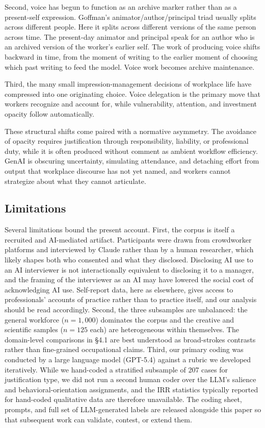 \documentclass[pdflatex,sn-basic]{sn-jnl}%
\theoremstyle{thmstyleone}%
\theoremstyle{thmstyletwo}%
\theoremstyle{thmstylethree}%
\begin{document}
Second, voice has begun to function as an archive marker rather than as a present-self expression. Goffman's animator/author/principal triad \citep{goffman1981forms} usually splits across different people. Here it splits across different versions of the same person across time. The present-day animator and principal speak for an author who is an archived version of the worker's earlier self. The work of producing voice shifts backward in time, from the moment of writing to the earlier moment of choosing which past writing to feed the model. Voice work becomes archive maintenance.
 
Third, the many small impression-management decisions of workplace life have compressed into one originating choice. Voice delegation is the primary move that workers recognize and account for, while vulnerability, attention, and investment opacity follow automatically.
 
These structural shifts come paired with a normative asymmetry. The avoidance of opacity requires justification through responsibility, liability, or professional duty, while it is often produced without comment as ambient workflow efficiency. GenAI is obscuring uncertainty, simulating attendance, and detaching effort from output that workplace discourse has not yet named, and workers cannot strategize about what they cannot articulate.

\subsection{Limitations}

Several limitations bound the present account. First, the corpus is itself a recruited and AI-mediated artifact. Participants were drawn from crowdworker platforms and interviewed by Claude rather than by a human researcher, which likely shapes both who consented and what they disclosed. Disclosing AI use to an AI interviewer is not interactionally equivalent to disclosing it to a manager, and the framing of the interviewer as an AI may have lowered the social cost of acknowledging AI use. Self-report data, here as elsewhere, gives access to professionals' accounts of practice rather than to practice itself, and our analysis should be read accordingly. Second, the three subsamples are unbalanced: the general workforce ($n = 1{,}000$) dominates the corpus and the creative and scientific samples ($n = 125$ each) are heterogeneous within themselves. The domain-level comparisons in \S 4.1 are best understood as broad-strokes contrasts rather than fine-grained occupational claims. Third, our primary coding was conducted by a large language model (GPT-5.4) against a rubric we developed iteratively. While we hand-coded a stratified subsample of 207 cases for justification type, we did not run a second human coder over the LLM's salience and behavioral-orientation assignments, and the IRR statistics typically reported for hand-coded qualitative data are therefore unavailable. The coding sheet, prompts, and full set of LLM-generated labels are released alongside this paper so that subsequent work can validate, contest, or extend them.
\end{document}
